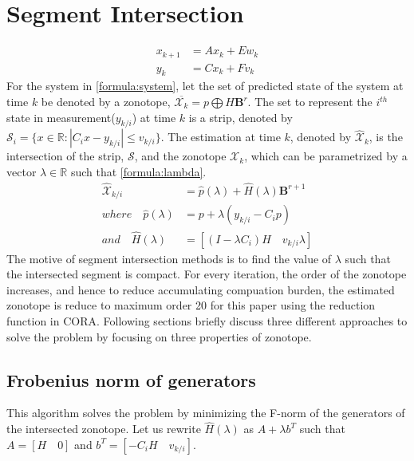 \section{Segment Intersection} 
\begin{equation}
\label{formula:system}
\begin{split}
x_{k+1} &= Ax_k + Ew_k\\
y_k &= Cx_k + Fv_k
\end{split}
\end{equation}
For the system in \eqref{formula:system}, let the set of predicted state of the system at time $k$ be denoted by a zonotope, $\overline{\mathcal{X}_k} = p\bigoplus H \textbf{B}^r$. The set to represent the $i^{th}$ state in measurement($y_{k/i}$) at time $k$ is a strip, denoted by $\mathscr{S}_i = \{x \in \mathbb{R} : |C_i x - y_{k/i}| \leq v_{k/i}\}$. The estimation at time $k$, denoted by $\mathcal{\hat{X}}_k$, is the intersection of the strip, $\mathscr{S}$, and the zonotope $\mathcal{X}_k$, which can be parametrized by a vector $\lambda \in \mathbb{R}$ such that \eqref{formula:lambda}. 
\begin{equation}
\label{formula:lambda}
\begin{split}
\mathcal{\hat{X}}_{k/i} &= \hat{p}(\lambda) + \hat{H}(\lambda)\textbf{B}^{r+1}  \\
where \quad \hat{p}(\lambda) &= p+ \lambda(y_{k/i} - C_ip)\\
and \quad \hat{H}(\lambda) &= [(I- \lambda C_i) H \quad v_{k/i}\lambda ]
\end{split}
\end{equation}
The motive of segment intersection methods is to find the value of $\lambda$ such that the intersected segment is compact. For every iteration, the order of the zonotope increases, and hence to reduce accumulating compuation burden, the estimated zonotope is reduce to maximum order 20 for this paper using the reduction function in CORA. Following sections briefly discuss three different approaches to solve the problem by focusing on three properties of zonotope.

\subsection{Frobenius norm of generators}
This algorithm solves the problem by minimizing the F-norm of the generators of the intersected zonotope. Let us rewrite $\hat{H}(\lambda)$ as $A+ \lambda b^T$ such that $A= [H \quad 0]$ and $b^T = [-C_i H \quad v_{k/i}]$.

